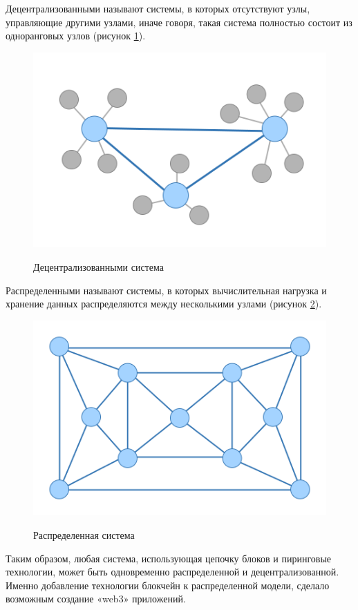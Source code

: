 Децентрализованными называют системы, в которых отсутствуют узлы, управляющие другими узлами, иначе говоря, такая система полностью состоит из одноранговых узлов (рисунок \ref{fig:decentralization}).

\begin{figure}[H]
\begin{center}
\includegraphics[width=0.7\hsize]{fig/decentralization.png}\\[2mm]
\caption{Децентрализованными система}\label{fig:decentralization}
\end{center}
\end{figure}

Распределенными называют системы, в которых вычислительная нагрузка и хранение данных распределяются между несколькими узлами (рисунок \ref{fig:cdn}).

\begin{figure}[H]
\begin{center}
\includegraphics[width=0.7\hsize]{fig/cdn.png}\\[2mm]
\caption{Распределенная система}\label{fig:cdn}
\end{center}
\end{figure}

Таким образом, любая система, использующая цепочку блоков и пиринговые технологии, может быть одновременно распределенной и децентрализованной. Именно добавление технологии блокчейн к распределенной модели, сделало возможным создание «web3» приложений.

